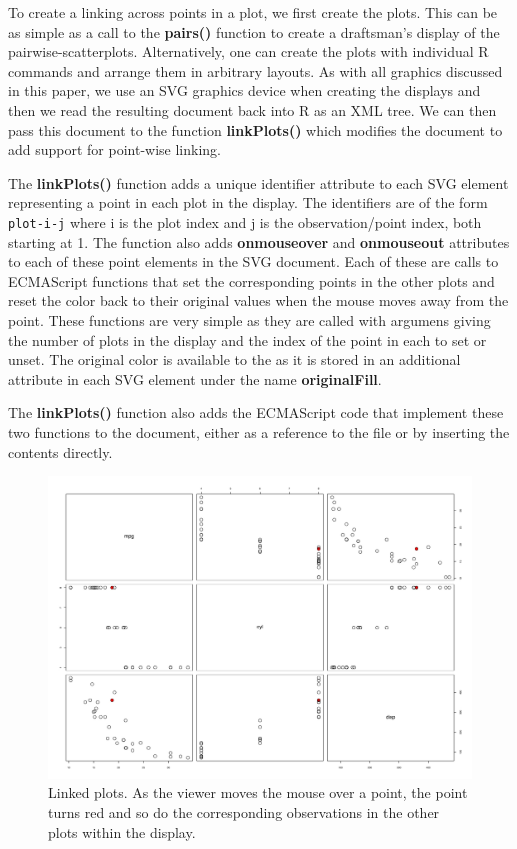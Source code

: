 \documentclass[article]{jss}
\def\Rfunc#1{\textbf{#1()}}
\def\SVGAt#1{\textbf{#1}}
\begin{document}
To create a linking across points in a plot, we first create the
plots. This can be as simple as a call to the \Rfunc{pairs} function
to create a draftsman's display of the pairwise-scatterplots.
Alternatively, one can create the plots with individual R commands and
arrange them in arbitrary layouts.  As with all graphics discussed in
this paper, we use an SVG graphics device when creating the displays
and then we read the resulting document back into R as an XML tree.
We can then pass this document to the function \Rfunc{linkPlots}
which modifies the document to add support for point-wise linking.

The \Rfunc{linkPlots} function adds a unique identifier attribute to
each SVG element representing a point in each plot in the display. The
identifiers are of the form \verb+plot-i-j+ where i is the plot index
and j is the observation/point index, both starting at 1.  The
function also adds \SVGAt{onmouseover} and \SVGAt{onmouseout} attributes to each of
these point elements in the SVG document.  Each of these are calls to
ECMAScript functions that set the corresponding points in the other
plots and reset the color back to their original values when the mouse
moves away from the point.  
These functions are very simple as they are called with argumens
giving the number of plots in the display and the index of the point
in each to set or unset.  The original color is available to the
 as it is stored in an additional attribute in
each SVG element under the name \SVGAt{originalFill}.

The \Rfunc{linkPlots} function also adds the ECMAScript code that
implement these two functions to the document, either as a reference
to the file or by inserting the contents directly.

\begin{figure}
  \centering
  \includegraphics{pairs_link.jpg}
  \caption{Linked plots.  As the viewer moves the mouse over a point,
   the point turns red and so do the corresponding observations in the
   other plots within the display.}
  \label{fig:linkedPairs}
\end{figure}
\end{document}
